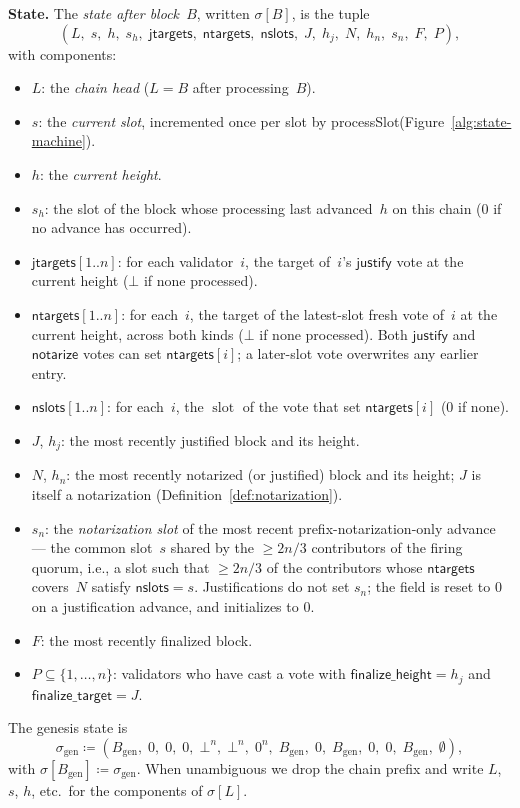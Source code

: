 \ifx\litemode\undefined\documentclass{article}\fi
\newcommand{\genesis}{\ensuremath{B_{\mathrm{gen}}}}
\newcommand{\slot}[0]{\ensuremath{\operatorname{\mathrm{slot}}}}
\newcommand{\just}{\ensuremath{\mathsf{justify}}\xspace}
\newcommand{\notar}{\ensuremath{\mathsf{notarize}}\xspace}
\newcommand{\finalizeHeight}{\mathsf{finalize\_height}}
\newcommand{\finalizeTarget}{\mathsf{finalize\_target}}
\newcommand{\jtargets}{\mathsf{jtargets}}
\newcommand{\ntargets}{\mathsf{ntargets}}
\newcommand{\nslots}{\mathsf{nslots}}
\newcommand{\processSlot}{\textsf{processSlot}\xspace}
\renewcommand{\paragraph}[1]{\vspace{7pt}\noindent\textbf{#1}}
\theoremstyle{plain}
\theoremstyle{definition}
\theoremstyle{remark}
\begin{document}
\paragraph{State.}
The \emph{state after block~$B$}, written $\sigma[B]$, is the tuple
\[
  (L,\; s,\; h,\; s_h,\; \jtargets,\; \ntargets,\; \nslots,\; J,\; h_j,\; N,\; h_n,\; s_n,\; F,\; P),
\]
with components:
\begin{itemize}
  \item $L$: the \emph{chain head} ($L = B$ after processing~$B$).
  \item $s$: the \emph{current slot}, incremented once per slot by \processSlot (Figure~\ref{alg:state-machine}).
  \item $h$: the \emph{current height}.
  \item $s_h$: the slot of the block whose processing last advanced~$h$ on this chain ($0$ if no advance has occurred).
  \item $\jtargets[1..n]$: for each validator~$i$, the target of~$i$'s \just vote at the current height ($\bot$ if none processed).
  \item $\ntargets[1..n]$: for each~$i$, the target of the latest-slot fresh vote of~$i$ at the current height, across both kinds ($\bot$ if none processed). Both \just and \notar votes can set $\ntargets[i]$; a later-slot vote overwrites any earlier entry.
  \item $\nslots[1..n]$: for each~$i$, the $\slot$ of the vote that set $\ntargets[i]$ ($0$ if none).
  \item $J$, $h_j$: the most recently justified block and its height.
  \item $N$, $h_n$: the most recently notarized (or justified) block and its height; $J$ is itself a notarization (Definition~\ref{def:notarization}).
  \item $s_n$: the \emph{notarization slot} of the most recent prefix-notarization-only advance --- the common slot~$s$ shared by the $\geq 2n/3$ contributors of the firing quorum, i.e., a slot such that $\geq 2n/3$ of the contributors whose $\ntargets$ covers~$N$ satisfy $\nslots = s$. Justifications do not set $s_n$; the field is reset to $0$ on a justification advance, and initializes to $0$.
  \item $F$: the most recently finalized block.
  \item $P \subseteq \{1, \ldots, n\}$: validators who have cast a vote with $\finalizeHeight = h_j$ and $\finalizeTarget = J$.
\end{itemize}
The genesis state is
\[
  \sigma_{\mathrm{gen}} \coloneqq (\genesis,\; 0,\; 0,\; 0,\; \bot^n,\; \bot^n,\; 0^n,\; \genesis,\; 0,\; \genesis,\; 0,\; 0,\; \genesis,\; \emptyset),
\]
with $\sigma[\genesis] \coloneqq \sigma_{\mathrm{gen}}$.
When unambiguous we drop the chain prefix and write $L$, $s$, $h$, etc.\ for the components of $\sigma[L]$.
\end{document}
